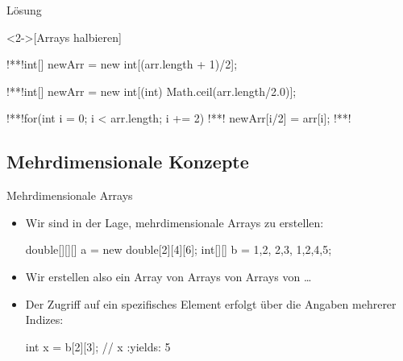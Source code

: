 \begin{frame}[c,fragile]{Lösung}
    \begin{solve}<2->[Arrays halbieren]
\begin{plainjava}
!**!int[] newArr = new int[(arr.length + 1)/2];
\end{plainjava}
\begin{plainjava}
!**!int[] newArr = new int[(int) Math.ceil(arr.length/2.0)];
\end{plainjava}
\begin{plainjava}
!**!for(int i = 0; i < arr.length; i += 2) {
!**!    newArr[i/2] = arr[i];
!**!}
\end{plainjava}
    \end{solve}
\end{frame}
\fi


\subsection{Mehrdimensionale Konzepte}%

\begin{frame}[fragile]{Mehrdimensionale Arrays}
    \begin{itemize}[<+(1)->]
        \widei
        \item Wir sind in der Lage, mehrdimensionale Arrays zu erstellen:\pause{}
\begin{plainjava}
double[][][] a = new double[2][4][6];
int[][] b = {{1,2}, {2,3}, {1,2,4,5}};
\end{plainjava}
        \item Wir erstellen also ein Array von Arrays von Arrays von \ldots
        \item Der Zugriff auf ein spezifisches Element erfolgt über die Angaben mehrerer Indizes:
\begin{plainjava}
int x = b[2][3]; // x :yields: 5
\end{plainjava}
    \end{itemize}
\end{frame}

